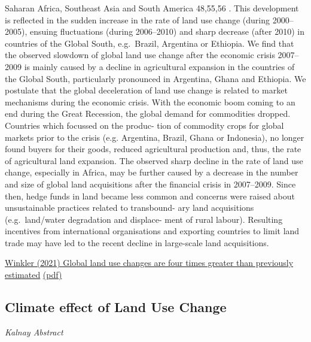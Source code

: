 \documentclass[
]{book}
\begin{document}
Saharan Africa, Southeast Asia and South America 48,55,56 . This
development is reflected in the sudden increase in the rate of land
use change (during 2000--2005), ensuing fluctuations (during
2006--2010) and sharp decrease (after 2010) in countries of the
Global South, e.g.~Brazil, Argentina or Ethiopia.
We find that the observed slowdown of global land
use change after the economic crisis 2007--2009 is mainly caused
by a decline in agricultural expansion in the countries of the
Global South, particularly pronounced in Argentina, Ghana and
Ethiopia. We postulate that the global
deceleration of land use change is related to market mechanisms
during the economic crisis. With the economic boom coming to
an end during the Great Recession, the global demand for
commodities dropped. Countries which focussed on the produc-
tion of commodity crops for global markets prior to the crisis (e.g.
Argentina, Brazil, Ghana or Indonesia), no longer found buyers
for their goods, reduced agricultural production and, thus, the
rate of agricultural land expansion. The observed sharp decline in
the rate of land use change, especially in Africa, may
be further caused by a decrease in the number and size of global
land acquisitions after the financial crisis in 2007--2009. Since
then, hedge funds in land became less common and concerns
were raised about unsustainable practices related to transbound-
ary land acquisitions (e.g.~land/water degradation and displace-
ment of rural labour). Resulting incentives from international
organisations and exporting countries to limit land trade may
have led to the recent decline in large-scale land acquisitions.

\href{https://www.nature.com/articles/s41467-021-22702-2}{Winkler (2021) Global land use changes are four times greater than previously estimated}
\href{pdf/Winkler_2021_LUC_4_times_greater.pdf}{(pdf)}

\hypertarget{climate-effect-of-land-use-change}{%
\subsection{Climate effect of Land Use Change}\label{climate-effect-of-land-use-change}}

\emph{Kalnay Abstract}
\end{document}
